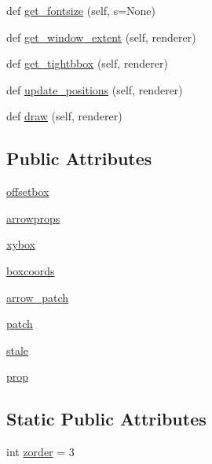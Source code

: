 \begin{DoxyCompactItemize}
def \hyperlink{classmatplotlib_1_1offsetbox_1_1AnnotationBbox_a949572ebf53e45660145a231b73a41ed}{get\+\_\+fontsize} (self, s=None)
\item 
def \hyperlink{classmatplotlib_1_1offsetbox_1_1AnnotationBbox_a4292164d445c4f3af0661065e3f9f8d9}{get\+\_\+window\+\_\+extent} (self, renderer)
\item 
def \hyperlink{classmatplotlib_1_1offsetbox_1_1AnnotationBbox_ac0c53e559cbb8d8cb6c975a2e063fd2e}{get\+\_\+tightbbox} (self, renderer)
\item 
def \hyperlink{classmatplotlib_1_1offsetbox_1_1AnnotationBbox_a1401cedd0a7bfc6a7385deff619451ee}{update\+\_\+positions} (self, renderer)
\item 
def \hyperlink{classmatplotlib_1_1offsetbox_1_1AnnotationBbox_a3c520a822bf0de79e3d57270194c0812}{draw} (self, renderer)
\end{DoxyCompactItemize}
\subsection*{Public Attributes}
\begin{DoxyCompactItemize}
\item 
\hyperlink{classmatplotlib_1_1offsetbox_1_1AnnotationBbox_aa90f0041e6ed2e9550c869e2e45e8966}{offsetbox}
\item 
\hyperlink{classmatplotlib_1_1offsetbox_1_1AnnotationBbox_a46ad3711eb74393eecb9ec71873632d8}{arrowprops}
\item 
\hyperlink{classmatplotlib_1_1offsetbox_1_1AnnotationBbox_aaf4535b6fde43d621a9673b3b5398631}{xybox}
\item 
\hyperlink{classmatplotlib_1_1offsetbox_1_1AnnotationBbox_a616654bc81c603102e6edfaff260a810}{boxcoords}
\item 
\hyperlink{classmatplotlib_1_1offsetbox_1_1AnnotationBbox_a1c23bfa16646c3a81f7cfa5e88c15b96}{arrow\+\_\+patch}
\item 
\hyperlink{classmatplotlib_1_1offsetbox_1_1AnnotationBbox_a89e15561ce87efa27cbe061c6c31eac4}{patch}
\item 
\hyperlink{classmatplotlib_1_1offsetbox_1_1AnnotationBbox_ad81682ae8e2d88c4b11203dbb7cceaf4}{stale}
\item 
\hyperlink{classmatplotlib_1_1offsetbox_1_1AnnotationBbox_a61605564fed62d916b37cb361e67a37c}{prop}
\end{DoxyCompactItemize}
\subsection*{Static Public Attributes}
\begin{DoxyCompactItemize}
\item 
int \hyperlink{classmatplotlib_1_1offsetbox_1_1AnnotationBbox_a28c1e0166d063006bb1bb61e6c68c1fd}{zorder} = 3
\end{DoxyCompactItemize}


